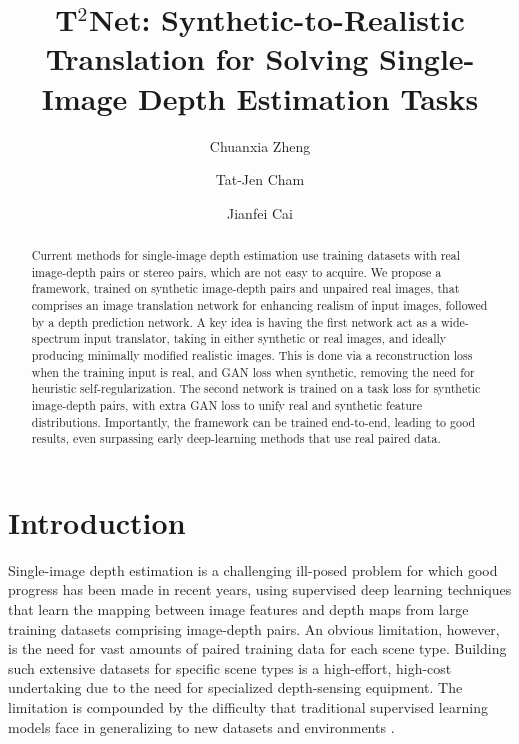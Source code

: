 \documentclass[runningheads]{llncs}
\begin{document}
\title{T$^2$Net: Synthetic-to-Realistic Translation for Solving Single-Image Depth Estimation Tasks} 




\author{Chuanxia Zheng\and
	Tat-Jen Cham \and
	Jianfei Cai}



\maketitle              \begin{abstract}

Current methods for single-image depth estimation use training datasets with real image-depth pairs or stereo pairs, which are not easy to acquire. We propose a framework, trained on synthetic image-depth pairs and unpaired real images, that comprises an image translation network for enhancing realism of input images, followed by a depth prediction network. A key idea is having the first network act as a wide-spectrum input translator, taking in either synthetic or real images, and ideally producing minimally modified realistic images. This is done via a reconstruction loss when the training input is real, and GAN loss when synthetic, removing the need for heuristic self-regularization. The second network is trained on a task loss for synthetic image-depth pairs, with extra GAN loss to unify real and synthetic feature distributions. Importantly, the framework can be trained end-to-end, leading to good results, even surpassing early deep-learning methods that use real paired data.
	
	
\end{abstract}
\section{Introduction} 

Single-image depth estimation is a challenging ill-posed problem for which good progress has been made in recent years, using supervised deep learning techniques \cite{eigen2014depth,eigen2015predicting,liu2016learning,laina2016deeper} that learn the mapping between image features and depth maps from large training datasets comprising image-depth pairs. An obvious limitation, however, is the need for vast amounts of paired training data for each scene type. Building such extensive datasets for specific scene types is a high-effort, high-cost undertaking \cite{saxena2009make3d,silberman2012indoor,Geiger2012CVPR} due to the need for specialized depth-sensing equipment. The limitation is compounded by the difficulty that traditional supervised learning models face in generalizing to new datasets and environments \cite{liu2016learning}.
\end{document}
